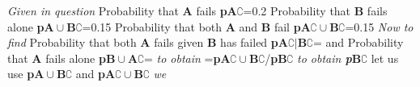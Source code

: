 
\textsl{Given in question}
Probability that \textbf{A} fails \textbf{p}\(\textbf{A} \complement \)=0.2
Probability that \textbf{B} fails alone \textbf{p}\(\textbf{A} \cup \textbf{B} \complement\)=0.15
Probability that both \textbf{A} and \textbf{B} fail \textbf{p}\(\textbf{A} \complement \cup \textbf{B} \complement\)=0.15
\textsl{Now to find}
Probability that both \textbf{A} fails given \textbf{B} has failed \textbf{p}\(\textbf{A} \complement|\textbf{B} \complement\)=\alpha
and Probability that \textbf{A} fails alone \textbf{p}\(\textbf{B} \cup \textbf{A} \complement\)=\beta
\textsl{to obtain \alpha}
\alpha=\textbf{p}\(\textbf{A} \complement \cup \textbf{B} \complement\)/\textbf{p}\(\textbf{B} \complement \)
\textit{to obtain \textbf{p}\(\textbf{B} \complement \) }
let us use \textbf{p}\(\textbf{A} \cup \textbf{B} \complement\) and \textbf{p}\(\textbf{A} \complement \cup \textbf{B} \complement\)
\textsl{we }
